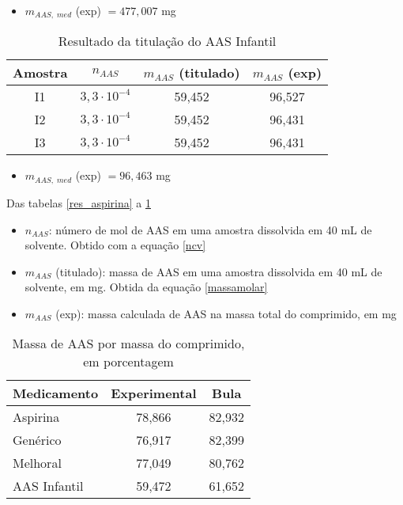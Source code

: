 \begin{itemize}
    \item $m_{AAS,\; med}$ (exp) $= 477,007$ mg
\end{itemize}

\begin{table}[H]
    \centering
    \begin{tabular}{c c c c}
        \toprule
        Amostra & $n_{AAS}$ & $m_{AAS}$ (titulado) & $m_{AAS}$ (exp) \\
        \midrule
        I1 & $3,3\cdot 10^{-4}$ & 59,452 & 96,527 \\
        I2 & $3,3\cdot 10^{-4}$ & 59,452 & 96,431 \\
        I3 & $3,3\cdot 10^{-4}$ & 59,452 & 96,431 \\
        \bottomrule
    \end{tabular}
    \caption{Resultado da titulação do AAS Infantil}
    \label{res_infantil}
\end{table}

\begin{itemize}
    \item $m_{AAS,\; med}$ (exp) $= 96,463$ mg
\end{itemize}

Das tabelas \ref{res_aspirina} a \ref{res_infantil}

\begin{itemize}
    \item[] $n_{AAS}$: número de mol de AAS em uma amostra dissolvida em 40 mL de solvente. Obtido
        com a equação \eqref{ncv}
    \item[] $m_{AAS}$ (titulado): massa de AAS em uma amostra dissolvida 
        em 40 mL de solvente, em mg. Obtida da equação \eqref{massamolar}
    \item[]$m_{AAS}$ (exp): massa calculada de AAS na massa total do comprimido, em mg
\end{itemize}

\begin{table}[H]\label{porcentagem2}
    \centering
    \begin{tabular}{l c c}
        \toprule
        Medicamento & Experimental & Bula \\
        \midrule
        Aspirina\R   & 78,866 & 82,932 \\
        Genérico     & 76,917  & 82,399 \\
        Melhoral     & 77,049  & 80,762 \\
        AAS Infantil & 59,472  & 61,652 \\
        \bottomrule
    \end{tabular}
    \caption{Massa de AAS por massa do comprimido, em porcentagem}
\end{table}
